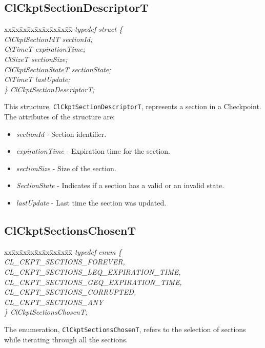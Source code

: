 \begin{flushleft}
\subsection{ClCkptSectionDescriptorT}
\begin{tabbing}
xx\=xx\=xx\=xx\=xx\=xx\=xx\=xx\=xx\=\kill
\textit{typedef struct \{}\\
\>\>\>\>\textit{ ClCkptSectionIdT        sectionId;}\\
\>\>\>\>\textit{ClTimeT                       expirationTime;}\\
\>\>\>\>\textit{ClSizeT                        sectionSize;}\\
\>\>\>\>\textit{ClCkptSectionStateT   sectionState;}\\
\>\>\>\>\textit{ClTimeT                       lastUpdate;}\\
\textit{\} ClCkptSectionDescriptorT;}\end{tabbing}
This structure, {\tt{ClCkptSectionDescriptorT}}, represents a section in a Checkpoint. The attributes of the structure are: 
\begin{itemize}
\item
\textit{sectionId}  - Section identifier.
\item
\textit{expirationTime} -  Expiration time for the section.
\item
\textit{sectionSize} - Size of the section.
\item
\textit{SectionState}  - Indicates if a section has a valid or an invalid state.
\item
\textit{lastUpdate} -  Last time the section was updated.
\end{itemize}



\subsection{ClCkptSectionsChosenT}
\begin{tabbing}
xx\=xx\=xx\=xx\=xx\=xx\=xx\=xx\=xx\=\kill
\textit{typedef enum \{}\\
\>\>\>\>\textit{CL\_CKPT\_SECTIONS\_FOREVER,}\\
\>\>\>\>\textit{CL\_CKPT\_SECTIONS\_LEQ\_EXPIRATION\_TIME,}\\
\>\>\>\>\textit{CL\_CKPT\_SECTIONS\_GEQ\_EXPIRATION\_TIME,}\\
\>\>\>\>\textit{CL\_CKPT\_SECTIONS\_CORRUPTED,}\\
\>\>\>\>\textit{CL\_CKPT\_SECTIONS\_ANY}\\
\textit{\} ClCkptSectionsChosenT;}\end{tabbing}
The enumeration, {\tt{ClCkptSectionsChosenT}}, refers to the selection of sections while iterating through all the sections.



\end{flushleft}
